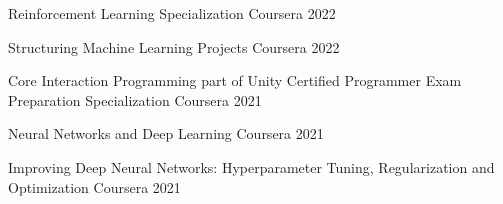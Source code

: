 

\begin{cvhonors}

    \cvcertificate
        {Reinforcement Learning Specialization} %
        {\href{https://www.coursera.org/account/accomplishments/specialization/certificate/FV2NKBWBR9LK}{\faExternalLink}}
        {Coursera} %
        {2022} %
  
    \cvcertificate
        {Structuring Machine Learning Projects} %
        {\href{https://www.coursera.org/account/accomplishments/certificate/AY82NTJF2VRF}{\faExternalLink}}
        {Coursera} %
        {2022} %
    
    
    \cvcertificate
        {Core Interaction Programming part of Unity Certified Programmer Exam Preparation Specialization} %
        {\href{https://www.coursera.org/account/accomplishments/certificate/HSKXK6HEX74D}{\faExternalLink}}
        {Coursera} %
        {2021} %

    \cvcertificate
        {Neural Networks and Deep Learning} %
        {\href{https://www.coursera.org/account/accomplishments/certificate/MLQBCU2JSMKN}{\faExternalLink}}
        {Coursera} %
        {2021} %
    
    

  
    
  \cvcertificate
    {Improving Deep Neural Networks: Hyperparameter Tuning, Regularization and Optimization} %
    {\href{https://www.coursera.org/account/accomplishments/certificate/2MDYLCW4WWLF}{\faExternalLink}}
    {Coursera} %
    {2021} %



\end{cvhonors}
